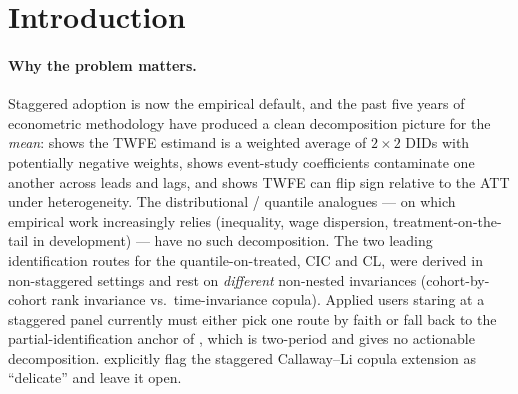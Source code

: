 \documentclass[11pt]{article}
\theoremstyle{definition}
\theoremstyle{plain}
\theoremstyle{remark}
\begin{document}
\section{Introduction}

\paragraph{Why the problem matters.} Staggered adoption is now the empirical default, and the past five years of econometric methodology have produced a clean decomposition picture for the \emph{mean}: \citet{GoodmanBacon2021} shows the TWFE estimand is a weighted average of $2\!\times\!2$ DIDs with potentially negative weights, \citet{SunAbraham2021} shows event-study coefficients contaminate one another across leads and lags, and \citet{deChaisemartinDHaultfoeuille2020} shows TWFE can flip sign relative to the ATT under heterogeneity. The distributional / quantile analogues --- on which empirical work increasingly relies (inequality, wage dispersion, treatment-on-the-tail in development) --- have no such decomposition. The two leading identification routes for the quantile-on-treated, \citet{AtheyImbens2006} CIC and \citet{CallawayLi2019} CL, were derived in non-staggered settings and rest on \emph{different} non-nested invariances (cohort-by-cohort rank invariance vs.\ time-invariance copula). Applied users staring at a staggered panel currently must either pick one route by faith or fall back to the partial-identification anchor of \citet{FanYu2012}, which is two-period and gives no actionable decomposition. \citet{LiLin2024} explicitly flag the staggered Callaway--Li copula extension as ``delicate'' and leave it open.
\end{document}
